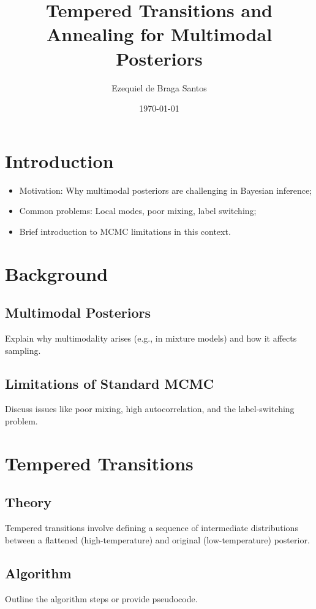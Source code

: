 \documentclass[11pt]{article}
\title{Tempered Transitions and Annealing for Multimodal Posteriors}
\author[1]{Ezequiel de Braga Santos}
\affil[1]{School of Applied Mathematics - Getulio Vargas Foundation (FGV EMAp)}
\date{\today}
\begin{document}
\maketitle

\begin{abstract}

\end{abstract}

\section{Introduction}

\begin{itemize}
    \item Motivation: Why multimodal posteriors are challenging in Bayesian inference;
    \item Common problems: Local modes, poor mixing, label switching;
    \item Brief introduction to MCMC limitations in this context.
\end{itemize}



\section{Background}
\subsection{Multimodal Posteriors}
Explain why multimodality arises (e.g., in mixture models) and how it affects sampling.

\subsection{Limitations of Standard MCMC}
Discuss issues like poor mixing, high autocorrelation, and the label-switching problem.

\section{Tempered Transitions}
\subsection{Theory}
Tempered transitions \citep{neal1996sampling} involve defining a sequence of intermediate distributions between a flattened (high-temperature) and original (low-temperature) posterior.

\subsection{Algorithm}
Outline the algorithm steps or provide pseudocode.
\end{document}
